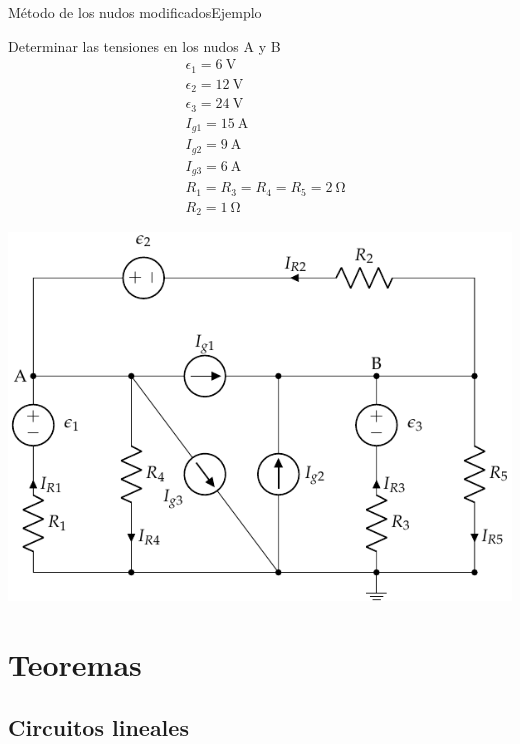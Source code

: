 \documentclass[aspectratio=169, xcolor={usenames,svgnames,dvipsnames}]{beamer}
\begin{document}
\begin{frame}{Método de los nudos modificados}{Ejemplo}
\begin{minipage}[c]{0.5\linewidth}
    Determinar las tensiones en los nudos A y B
\begin{align*}
    &\epsilon_1=\qty{6}{\volt}\\
    &\epsilon_2=\qty{12}{\volt} \\
    &\epsilon_3=\qty{24}{\volt}\\
    &I_{g1}= \qty{15}{\ampere}\\
    &I_{g2} =\qty{9}{\ampere}\\
    &I_{g3}= \qty{6}{\ampere}\\
    &R_{1}= R_3 = R_4 = R_5 = \qty{2}{\ohm}\\
    &R_{2}= \qty{1}{\ohm}
\end{align*}
\end{minipage}
\hfill
\begin{minipage}[c]{0.485\linewidth}
\begin{center}
    \includegraphics[width=\linewidth]{../figs/nudos_fuentes.pdf}
\end{center}
\end{minipage}
\end{frame}

\section{Teoremas}

\subsection{Circuitos lineales} 
\end{document}
